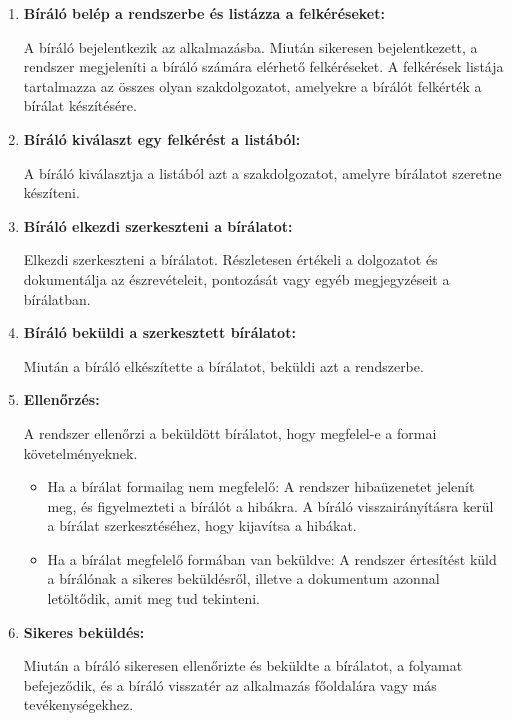 \begin{enumerate}

\item \textbf{Bíráló belép a rendszerbe és listázza a felkéréseket:}

A bíráló bejelentkezik az alkalmazásba. Miután sikeresen bejelentkezett, a rendszer megjeleníti a bíráló számára elérhető felkéréseket. A felkérések listája tartalmazza az összes olyan szakdolgozatot, amelyekre a bírálót felkérték a bírálat készítésére.

\item \textbf{Bíráló kiválaszt egy felkérést a listából:}

A bíráló kiválasztja a listából azt a szakdolgozatot, amelyre bírálatot szeretne készíteni.

\item \textbf{Bíráló elkezdi szerkeszteni a bírálatot:}

Elkezdi szerkeszteni a bírálatot. Részletesen értékeli a dolgozatot és dokumentálja az észrevételeit, pontozását vagy egyéb megjegyzéseit a bírálatban.

\item \textbf{Bíráló beküldi a szerkesztett bírálatot:}

Miután a bíráló elkészítette a bírálatot, beküldi azt a rendszerbe.

\item \textbf{Ellenőrzés:}

A rendszer ellenőrzi a beküldött bírálatot, hogy megfelel-e a formai követelményeknek.
\begin{itemize}
\item Ha a bírálat formailag nem megfelelő:
A rendszer hibaüzenetet jelenít meg, és figyelmezteti a bírálót a hibákra.
A bíráló visszairányításra kerül a bírálat szerkesztéséhez, hogy kijavítsa a hibákat.
\item Ha a bírálat megfelelő formában van beküldve:
A rendszer értesítést küld a bírálónak a sikeres beküldésről, illetve a dokumentum azonnal letöltődik, amit meg tud tekinteni.
\end{itemize}

\item \textbf{Sikeres beküldés:}

Miután a bíráló sikeresen ellenőrizte és beküldte a bírálatot, a folyamat befejeződik, és a bíráló visszatér az alkalmazás főoldalára vagy más tevékenységekhez.

\end{enumerate}

